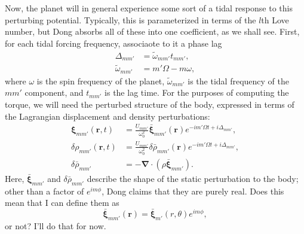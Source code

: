 \documentclass[12pt]{article}
\newcommand*{\bm}[1]{\boldsymbol{\mathbf{#1}}}
\newcommand*{\p}[1]{\left(#1\right)}
\begin{document}
Now, the planet will in general experience some sort of a tidal response to this
perturbing potential. Typically, this is parameterized in terms of the $l$th
Love number, but Dong absorbs all of these into one coefficient, as we shall
see. First, for each tidal forcing frequency, associaote to it a phase lag
\begin{align}
    \Delta_{mm'} &= \tilde{\omega}_{mm'}t_{mm'},\\
    \tilde{\omega}_{mm'} &= m'\Omega - m\omega,
\end{align}
where $\omega$ is the spin frequency of the planet, $\tilde{\omega}_{mm'}$
is the tidal frequency of the $mm'$ component, and $t_{mm'}$ is the lag time.
For the purposes of computing the torque, we will need the perturbed structure
of the body, expressed in terms of the Lagrangian displacement and density
perturbations:
\begin{align}
    \bm{\xi}_{mm'}\p{\bm{r}, t}
        &=
            \frac{U_{mm'}}{\omega_0^2}
            \bar{\bm{\xi}}_{mm'}\p{\bm{r}}
            e^{-im'\Omega t + i\Delta_{mm'}},\\
    \delta \rho_{mm'}\p{\bm{r}, t}
        &=
            \frac{U_{mm'}}{\omega_0^2}
            \delta \bar{\rho}_{mm'}(\bm{r})
            e^{-im'\Omega t + i\Delta_{mm'}},\\
    \delta \bar{\rho}_{mm'}
        &= -\bm{\nabla} \cdot \p{\rho \bar{\bm{\xi}}_{mm'}}.
\end{align}
Here, $\bar{\bm{\xi}}_{mm'}$ and $\delta \bar{\rho}_{mm'}$ describe the shape of
the static perturbation to the body; other than a factor of $e^{im\phi}$, Dong
claims that they are purely real. Does this mean that I can define them as
\begin{equation}
    \bar{\bm{\xi}}_{mm'}\p{\bm{r}}
        = \bar{\bm{\xi}}_{m'}\p{r, \theta}e^{im\phi},
\end{equation}
or not? I'll do that for now.
\end{document}
